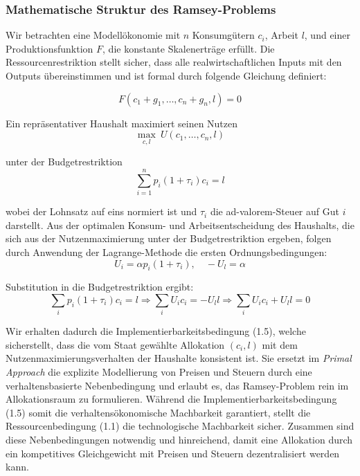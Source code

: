 \vspace{1em}
\subsubsection{Mathematische Struktur des Ramsey-Problems}

Wir betrachten eine Modellökonomie mit \( n \) Konsumgütern \( c_i \), Arbeit \( l \), und einer Produktionsfunktion \( F \), die konstante Skalenerträge erfüllt. Die Ressourcenrestriktion stellt sicher, dass alle realwirtschaftlichen Inputs mit den Outputs übereinstimmen und ist formal durch folgende Gleichung definiert:

\begin{equation}
F(c_1 + g_1, \dots, c_n + g_n, l) = 0 \tag{1.0}
\end{equation}

Ein repräsentativer Haushalt maximiert seinen Nutzen
\begin{equation}
\max_{c, l} \ U(c_1, \dots, c_n, l) \tag{1.1}
\end{equation}

unter der Budgetrestriktion
\begin{equation}
\sum_{i=1}^n p_i(1 + \tau_i)c_i = l \tag{1.2}
\end{equation}

wobei der Lohnsatz auf eins normiert ist und \( \tau_i \) die ad-valorem-Steuer auf Gut \( i \) darstellt. Aus der optimalen Konsum- und Arbeitsentscheidung des Haushalts, die sich aus der Nutzenmaximierung unter der Budgetrestriktion ergeben, folgen durch Anwendung der Lagrange-Methode die ersten Ordnungsbedingungen:
\begin{equation}
U_i = \alpha p_i(1 + \tau_i), \quad -U_l = \alpha \tag{1.3--1.4}
\end{equation}

Substitution in die Budgetrestriktion ergibt:
\begin{equation}
\sum_i p_i(1 + \tau_i)c_i = l \Rightarrow \sum_i U_i c_i = -U_l l \Rightarrow \sum_i U_i c_i + U_l l = 0 \tag{1.5}
\end{equation} 

Wir erhalten dadurch die Implementierbarkeitsbedingung (1.5), welche sicherstellt, dass die vom Staat gewählte Allokation \( (c_i, l) \) mit dem Nutzenmaximierungsverhalten der Haushalte konsistent ist. Sie ersetzt im \textit{Primal Approach} die explizite Modellierung von Preisen und Steuern durch eine verhaltensbasierte Nebenbedingung und erlaubt es, das Ramsey-Problem rein im Allokationsraum zu formulieren. Während die Implementierbarkeitsbedingung (1.5) somit die verhaltensökonomische Machbarkeit garantiert, stellt die Ressourcenbedingung (1.1) die technologische Machbarkeit sicher. Zusammen sind diese Nebenbedingungen notwendig und hinreichend, damit eine Allokation durch ein kompetitives Gleichgewicht mit Preisen und Steuern dezentralisiert werden kann.

